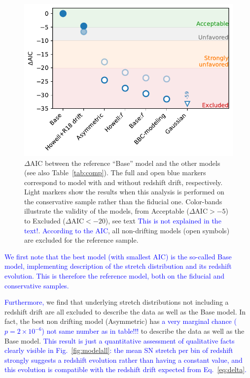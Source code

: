 \documentclass[]{aa} %
\newcommand{\mr}[1]{{\textcolor[rgb]{0.60,0.10,0.6}{#1}}}
\newcommand{\yc}[1]{{\textcolor{blue}{#1}}}
\begin{document}
\begin{figure}
    \centering
    \includegraphics[width=\linewidth]{Article_figures/mod_comp.pdf}
    \caption{$\Delta$AIC between the reference ``Base'' model and the other
    models (see also Table~\ref{tab:comp}). The full and open blue markers
correspond to model with and without redshift drift, respectively. Light markers
show the results when this analysis is performed on the conservative sample 
rather than the fiducial one. Color-bands illustrate the validity of the models, from 
Acceptable ($\Delta\mathrm{AIC} > -5$) to Excluded ($\Delta\mathrm{AIC} < -20$),
see text \yc{This is not explained in the text!}. \yc{According to the AIC}, all non-drifting models (open symbols) are excluded for the reference sample.}
    \label{fig:mod_comp}
\end{figure}

\yc{We first note that the best model (with smallest AIC) is the so-called Base model, 
implementing \cite{rigault2018} description of the stretch distribution and its 
redshift evolution. This is therefore the reference model, both on the fiducial and 
conservative samples.}

\mr{\yc{Furthermore,} we find that underlying stretch distributions not including 
    a redshift drift are all
    excluded to describe the data as well as the Base model. In fact,
    the best non drifting model (Asymmetric) has \yc{a very marginal chance 
    ($p = 2\times10^{-6}$)} \yc{not same number as in table!!!} to
    describe the data as well as the Base model.}
    \yc{This result is just a quantitative assessment of qualitative facts clearly visible in 
    Fig.~\ref{fig:modelall}: the mean SN stretch per bin of redshift strongly 
    suggests a redshift evolution rather than having a constant value, and this evolution is compatible with the redshift drift expected from Eq.~\ref{eq:delta}.}
\end{document}
